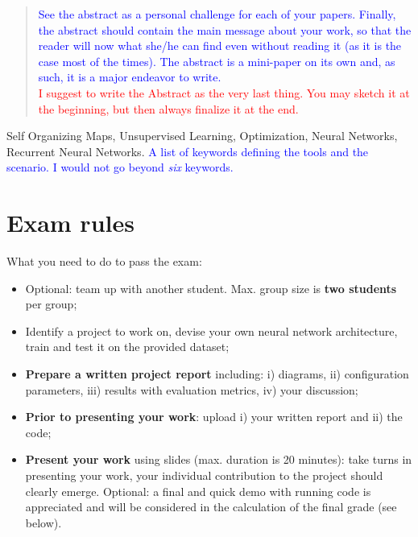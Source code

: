 \documentclass[10pt, conference, letterpaper]{IEEEtran}
\newcommand\MR[1]{\textcolor{blue}{#1}}
\newcommand\red[1]{\textcolor{red}{#1}}
\begin{document}
\begin{abstract}
\MR{See the abstract as a personal challenge for each of your papers. Finally, the abstract should contain the main message about your work, so that the reader will now what she/he can find even without reading it (as it is the case most of the times). The abstract is a mini-paper on its own and, as such, it is a major endeavor to write.}\\ 

\red{I suggest to write the Abstract as the very last thing. You may sketch it at the beginning, but then always finalize it at the end.}
\end{abstract}

\IEEEkeywords
Self Organizing Maps, Unsupervised Learning, Optimization, Neural Networks, Recurrent Neural Networks. \MR{A list of keywords defining the tools and the scenario. I would not go beyond {\it six} keywords.}
\endIEEEkeywords












\section{Exam rules}

What you need to do to pass the exam:
\begin{itemize}
\item Optional: team up with another student. Max. group size is \textbf{two students} per group;
\item Identify a project to work on, devise your own neural network architecture, train and test it on the provided dataset;
\item \textbf{Prepare a written project report} including: i) diagrams, ii) configuration parameters, iii) results with evaluation metrics, iv) your discussion;
\item \textbf{Prior to presenting your work}: upload i) your written report and ii) the code;
\item \textbf{Present your work} using slides (max. duration is 20 minutes): take turns in presenting your work, your individual contribution to the project should clearly emerge. Optional: a final and quick demo with running code is appreciated and will be considered in the calculation of the final grade (see below). 
\end{itemize}
\end{document}

